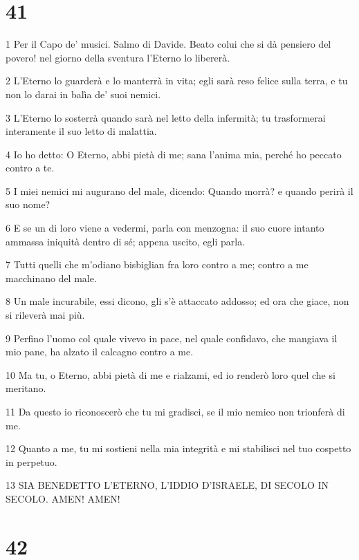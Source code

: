 \chapter{41}

\par 1 Per il Capo de' musici. Salmo di Davide. Beato colui che si dà pensiero del povero! nel giorno della sventura l'Eterno lo libererà.
\par 2 L'Eterno lo guarderà e lo manterrà in vita; egli sarà reso felice sulla terra, e tu non lo darai in balìa de' suoi nemici.
\par 3 L'Eterno lo sosterrà quando sarà nel letto della infermità; tu trasformerai interamente il suo letto di malattia.
\par 4 Io ho detto: O Eterno, abbi pietà di me; sana l'anima mia, perché ho peccato contro a te.
\par 5 I miei nemici mi augurano del male, dicendo: Quando morrà? e quando perirà il suo nome?
\par 6 E se un di loro viene a vedermi, parla con menzogna: il suo cuore intanto ammassa iniquità dentro di sé; appena uscito, egli parla.
\par 7 Tutti quelli che m'odiano bisbiglian fra loro contro a me; contro a me macchinano del male.
\par 8 Un male incurabile, essi dicono, gli s'è attaccato addosso; ed ora che giace, non si rileverà mai più.
\par 9 Perfino l'uomo col quale vivevo in pace, nel quale confidavo, che mangiava il mio pane, ha alzato il calcagno contro a me.
\par 10 Ma tu, o Eterno, abbi pietà di me e rialzami, ed io renderò loro quel che si meritano.
\par 11 Da questo io riconoscerò che tu mi gradisci, se il mio nemico non trionferà di me.
\par 12 Quanto a me, tu mi sostieni nella mia integrità e mi stabilisci nel tuo cospetto in perpetuo.
\par 13 SIA BENEDETTO L'ETERNO, L'IDDIO D'ISRAELE, DI SECOLO IN SECOLO. AMEN! AMEN!

\chapter{42}

